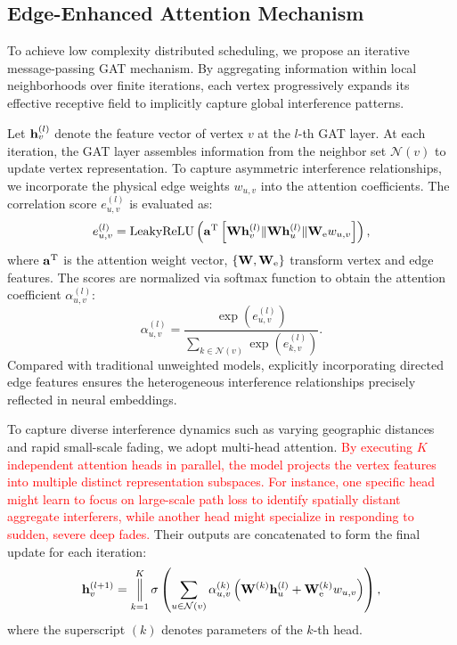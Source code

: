 \documentclass[journal]{IEEEtran}
\begin{document}
	\subsection{Edge-Enhanced Attention Mechanism}
	To achieve low complexity distributed scheduling, we propose an iterative message-passing GAT mechanism. By aggregating information within local neighborhoods over finite iterations, each vertex progressively expands its effective receptive field to implicitly capture global interference patterns. 
	
	Let ${\bf h}_v^{(l)}$ denote the feature vector of vertex $v$ at the $l$-th GAT layer. At each iteration, the GAT layer assembles information from the neighbor set $\mathcal{N}(v)$ to update vertex representation. To capture asymmetric interference relationships, we incorporate the physical edge weights $w_{u,v}$ into the attention coefficients. The correlation score $e_{u,v}^{(l)}$ is evaluated as:
	\begin{equation}
		e_{u,v}^{(l)} = \mathrm{LeakyReLU}\left({\bf a}^{\mathrm{T}} \left[ {\bf W}{\bf h}_v^{(l)} \Vert {\bf W}{\bf h}_u^{(l)} \Vert {\bf W}_{\mathrm{e}}w_{u,v} \right]\right),
	\end{equation}
	where ${\bf a}^{\mathrm{T}}$ is the attention weight vector, $\{{\bf W},{\bf W}_{\mathrm{e}}\}$ transform vertex and edge features. The scores are normalized via softmax function to obtain the attention coefficient $\alpha_{u,v}^{(l)}$:
	\begin{equation}
		\alpha_{u,v}^{(l)} = \frac{\exp\left(e_{u,v}^{(l)}\right)}{\sum_{k\in\mathcal{N}(v)}\exp\left(e_{k,v}^{(l)}\right)}. \label{attention}
	\end{equation}
	Compared with traditional unweighted models, explicitly incorporating directed edge features ensures the heterogeneous interference relationships precisely reflected in neural embeddings.
	
	To capture diverse interference dynamics such as varying geographic distances and rapid small-scale fading, we adopt multi-head attention. \textcolor{red}{By executing $K$ independent attention heads in parallel, the model projects the vertex features into multiple distinct representation subspaces. For instance, one specific head might learn to focus on large-scale path loss to identify spatially distant aggregate interferers, while another head might specialize in responding to sudden, severe deep fades.} Their outputs are concatenated to form the final update for each iteration:
	\begin{equation}
		{\bf h}_v^{(l+1)} = \mathop{\Big\Vert}_{k=1}^K \sigma\left( \sum_{u\in\mathcal{N}(v)}\alpha_{u,v}^{(k)}
		\left({\bf W}^{(k)}{\bf h}_u^{(l)} + {\bf W}_{\mathrm{e}}^{(k)}w_{u,v}\right)
		\right),
	\end{equation}
	where the superscript $(k)$ denotes parameters of the $k$-th head. 
	
\end{document}
